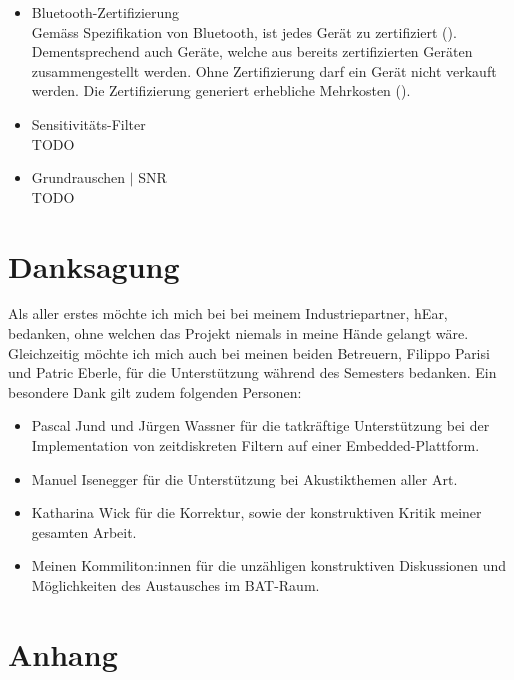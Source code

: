 \documentclass[12pt]{article}
\begin{document}
\begin{itemize}
		\item Bluetooth-Zertifizierung\\
		Gemäss Spezifikation von Bluetooth, ist jedes Gerät zu zertifiziert (\cite{noauthor_bluetooth_nodate-1}). Dementsprechend auch Geräte, welche aus bereits zertifizierten Geräten zusammengestellt werden. Ohne Zertifizierung darf ein Gerät nicht verkauft werden. Die Zertifizierung generiert erhebliche Mehrkosten (\cite{noauthor_bluetooth_nodate}).
		\item Sensitivitäts-Filter \\
		\color{red}TODO\color{black}
		\item Grundrauschen $\vert$ SNR \\
		\color{red}TODO\color{black}
	\end{itemize}
	
	\newpage
	\section*{Danksagung}
	Als aller erstes möchte ich mich bei bei meinem Industriepartner, hEar, bedanken, ohne welchen das Projekt niemals in meine Hände gelangt wäre. Gleichzeitig möchte ich mich auch bei meinen beiden Betreuern, Filippo Parisi und Patric Eberle, für die Unterstützung während des Semesters bedanken. Ein besondere Dank gilt zudem folgenden Personen:
	\begin{itemize}
		\item Pascal Jund und Jürgen Wassner für die tatkräftige Unterstützung bei der Implementation von zeitdiskreten Filtern auf einer Embedded-Plattform.
		\item Manuel Isenegger für die Unterstützung bei Akustikthemen aller Art.
		\item Katharina Wick für die Korrektur, sowie der konstruktiven Kritik meiner gesamten Arbeit.
		\item Meinen Kommiliton:innen für die unzähligen konstruktiven Diskussionen und Möglichkeiten des Austausches im BAT-Raum. 
	\end{itemize}
	
	\newpage
	\section{Anhang}
	
	
	
	\newpage
	\listoffigures
	
	\newpage
	
\end{document}
